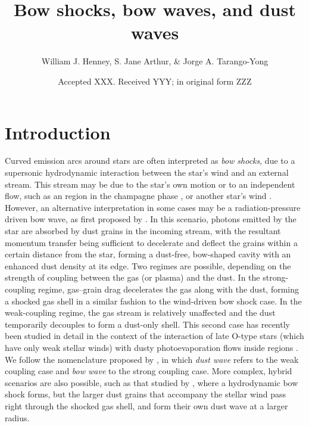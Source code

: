 \message{ !name(dusty-bow-wave.tex)}\documentclass[useAMS, usenatbib, a4paper]{mnras}
\title
{Bow shocks, bow waves, and dust waves}
\author[Henney, Arthur, \& Tarango Yong]{
  William J. Henney, S. Jane Arthur, \& Jorge A. Tarango-Yong\\
  \AddressCRyA
}
\date{Accepted XXX. Received YYY; in original form ZZZ}
\begin{document}

\section{Introduction}
\label{sec:introduction}
\newcommand\hii{\ion{H}{ii}}

Curved emission arcs around stars \citep[e.g.,][]{Gull:1979a} are
often interpreted as \textit{bow shocks}, due to a supersonic
hydrodynamic interaction between the star's wind and an external
stream. This stream may be due to the star's own motion or to an
independent flow, such as an \hii{} region in the champagne phase
\citep{Tenorio-Tagle:1979a}, or another star's wind
\citep{Canto:1996}. However, an alternative interpretation in some
cases may be a radiation-pressure driven bow wave, as first proposed
by \citet[\S\textsc{vi}]{van-Buren:1988a}.  In this scenario, photons
emitted by the star are absorbed by dust grains in the incoming
stream, with the resultant momentum transfer being sufficient to
decelerate and deflect the grains within a certain distance from the
star, forming a dust-free, bow-shaped cavity with an enhanced dust
density at its edge.  Two regimes are possible, depending on the
strength of coupling between the gas (or plasma) and the dust.  In the
strong-coupling regime, gas--grain drag decelerates the gas along with
the dust, forming a shocked gas shell in a similar fashion to the
wind-driven bow shock case.  In the weak-coupling regime, the gas
stream is relatively unaffected and the dust temporarily decouples to
form a dust-only shell.  This second case has recently been studied in
detail in the context of the interaction of late O-type stars (which
have only weak stellar winds) with dusty photoevaporation flows inside
\hii{} regions \citep{Ochsendorf:2014a, Ochsendorf:2014b,
  Ochsendorf:2015a}.  We follow the nomenclature proposed by
\citet{Ochsendorf:2014b}, in which \textit{dust wave} refers to the
weak coupling case and \textit{bow wave} to the strong coupling case.
More complex, hybrid scenarios are also possible, such as that studied
by \citet{van-Marle:2011a}, where a hydrodynamic bow shock forms, but
the larger dust grains that accompany the stellar wind pass right
through the shocked gas shell, and form their own dust wave at a
larger radius.
\end{document}

